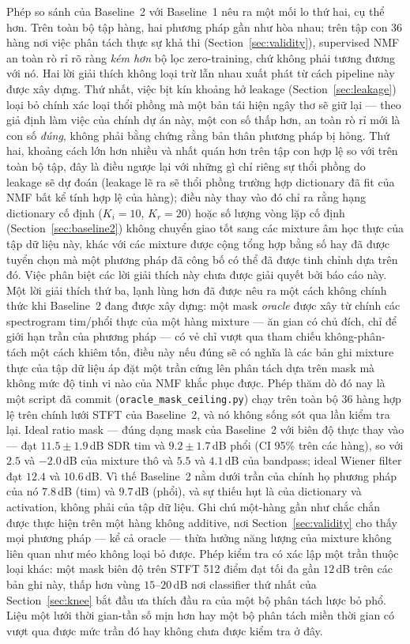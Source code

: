 \documentclass[11pt]{article}
\begin{document}
Phép so sánh của Baseline~2 với Baseline~1 nêu ra một mối lo thứ hai, cụ
thể hơn. Trên toàn bộ tập hàng, hai phương pháp gần như hòa nhau; trên
tập con 36 hàng nơi việc phân tách thực sự khả thi
(Section~\ref{sec:validity}), supervised NMF an toàn rò rỉ rõ ràng
\emph{kém hơn} bộ lọc zero-training, chứ không phải tương đương với nó.
Hai lời giải thích không loại trừ lẫn nhau xuất phát từ cách pipeline
này được xây dựng. Thứ nhất, việc bịt kín khoảng hở leakage
(Section~\ref{sec:leakage}) loại bỏ chính xác loại thổi phồng mà một bản
tái hiện ngây thơ sẽ giữ lại --- theo giả định làm việc của chính dự án
này, một con số thấp hơn, an toàn rò rỉ mới là con số \emph{đúng}, không
phải bằng chứng rằng bản thân phương pháp bị hỏng. Thứ hai, khoảng cách
lớn hơn nhiều và nhất quán hơn trên tập con hợp lệ so với trên toàn bộ
tập, đây là điều ngược lại với những gì chỉ riêng sự thổi phồng do
leakage sẽ dự đoán (leakage lẽ ra sẽ thổi phồng trường hợp dictionary đã
fit của NMF bất kể tính hợp lệ của hàng); điều này thay vào đó chỉ ra
rằng hạng dictionary cố định ($K_i{=}10$, $K_r{=}20$) hoặc số lượng vòng
lặp cố định (Section~\ref{sec:baseline2}) không chuyển giao tốt sang các
mixture âm học thực của tập dữ liệu này, khác với các mixture được cộng
tổng hợp bằng số hay đã được tuyển chọn mà một phương pháp đã công bố có
thể đã được tinh chỉnh dựa trên đó. Việc phân biệt các lời giải thích
này chưa được giải quyết bởi báo cáo này. Một lời giải thích thứ ba,
lạnh lùng hơn đã được nêu ra một cách không chính thức khi Baseline~2
đang được xây dựng: một mask \emph{oracle} được xây từ chính các
spectrogram tim/phổi thực của một hàng mixture --- ăn gian có chủ đích,
chỉ để giới hạn trần của phương pháp --- có vẻ chỉ vượt qua tham chiếu
không-phân-tách một cách khiêm tốn, điều này nếu đúng sẽ có nghĩa là các
bản ghi mixture thực của tập dữ liệu áp đặt một trần cứng lên phân tách
dựa trên mask mà không mức độ tinh vi nào của NMF khắc phục được. Phép
thăm dò đó nay là một script đã commit (\texttt{oracle\_mask\_ceiling.py})
chạy trên toàn bộ 36 hàng hợp lệ trên chính lưới STFT của Baseline~2, và
nó không sống sót qua lần kiểm tra lại. Ideal ratio mask --- đúng dạng
mask của Baseline~2 với biên độ thực thay vào --- đạt $11.5 \pm 1.9$\,dB
SDR tim và $9.2 \pm 1.7$\,dB phổi (CI 95\% trên các hàng), so với $2.5$
và $-2.0$\,dB của mixture thô và $5.5$ và $4.1$\,dB của bandpass; ideal
Wiener filter đạt $12.4$ và $10.6$\,dB. Vì thế Baseline~2 nằm dưới trần
của chính họ phương pháp của nó $7.8$\,dB (tim) và $9.7$\,dB (phổi), và
sự thiếu hụt là của dictionary và activation, không phải của tập dữ liệu.
Ghi chú một-hàng gần như chắc chắn được thực hiện trên một hàng không
additive, nơi Section~\ref{sec:validity} cho thấy mọi phương pháp --- kể
cả oracle --- thừa hưởng năng lượng của mixture không liên quan như méo
không loại bỏ được. Phép kiểm tra có xác lập một trần thuộc loại khác:
một mask biên độ trên STFT 512 điểm đạt tối đa gần $12$\,dB trên các bản
ghi này, thấp hơn vùng $15$--$20$\,dB nơi classifier thứ nhất của
Section~\ref{sec:knee} bắt đầu ưa thích đầu ra của một bộ phân tách lược
bỏ phổ. Liệu một
lưới thời gian-tần số mịn hơn hay một bộ phân tách miền thời gian có vượt
qua được mức trần đó hay không chưa được kiểm tra ở đây.
\end{document}
